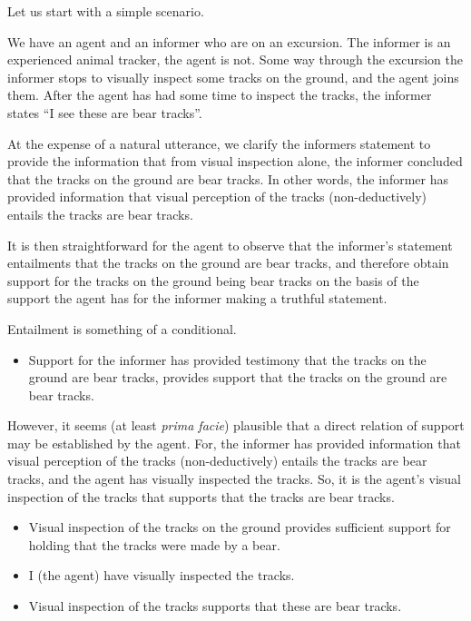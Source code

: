 \begin{note}
  Let us start with a simple scenario.

  \begin{scenario}[Tracking]
    We have an agent and an informer who are on an excursion.
    The informer is an experienced animal tracker, the agent is not.
    Some way through the excursion the informer stops to visually inspect some tracks on the ground, and the agent joins them.
    After the agent has had some time to inspect the tracks, the informer states ``I see these are bear tracks''.
  \end{scenario}

  At the expense of a natural utterance, we clarify the informers statement to provide the information that from visual inspection alone, the informer concluded that the tracks on the ground are bear tracks.
  In other words, the informer has provided information that visual perception of the tracks (non-deductively) entails the tracks are bear tracks.

  It is then straightforward for the agent to observe that the informer's statement entailments that the tracks on the ground are bear tracks, and therefore obtain support for the tracks on the ground being bear tracks on the basis of the support the agent has for the informer making a truthful statement.

  Entailment is something of a conditional.

  \begin{itemize}
  \item Support for the informer has provided testimony that the tracks on the ground are bear tracks, provides support that the tracks on the ground are bear tracks.
  \end{itemize}

  However, it seems (at least \emph{prima facie}) plausible that a direct relation of support may be established by the agent.
  For, the informer has provided information that visual perception of the tracks (non-deductively) entails the tracks are bear tracks, and the agent has visually inspected the tracks.
  So, it is the agent's visual inspection of the tracks that supports that the tracks are bear tracks.

  \begin{itemize}
  \item Visual inspection of the tracks on the ground provides sufficient support for holding that the tracks were made by a bear.
  \item I (the agent) have visually inspected the tracks.
  \item Visual inspection of the tracks supports that these are bear tracks.
  \end{itemize}


\end{note}
